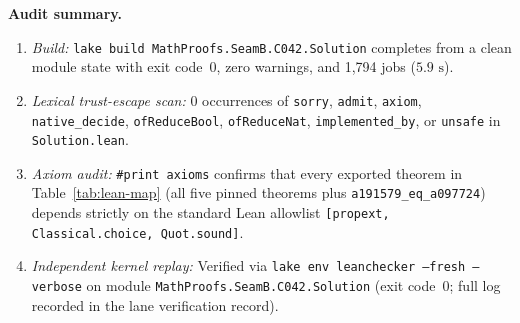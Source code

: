 \documentclass[11pt]{article}
\theoremstyle{definition}
\begin{document}
\noindent\textbf{Audit summary.}
\begin{enumerate}
\item \emph{Build:} \nolinkurl{lake build MathProofs.SeamB.C042.Solution} completes from a clean module state with exit code~$0$, zero warnings, and 1{,}794 jobs ($5.9\text{ s}$).
\item \emph{Lexical trust-escape scan:} $0$ occurrences of \texttt{sorry}, \texttt{admit}, \texttt{axiom}, \texttt{native\_decide}, \texttt{ofReduceBool}, \texttt{ofReduceNat}, \texttt{implemented\_by}, or \texttt{unsafe} in \texttt{Solution.lean}.
\item \emph{Axiom audit:} \texttt{\#print axioms} confirms that every exported theorem in Table~\ref{tab:lean-map} (all five pinned theorems plus \texttt{a191579\_eq\_a097724}) depends strictly on the standard Lean allowlist \texttt{[propext, Classical.choice, Quot.sound]}.
\item \emph{Independent kernel replay:} Verified via \texttt{lake env leanchecker --fresh --verbose} on module \nolinkurl{MathProofs.SeamB.C042.Solution} (exit code~$0$; full log recorded in the lane verification record).
\end{enumerate}
\end{document}
